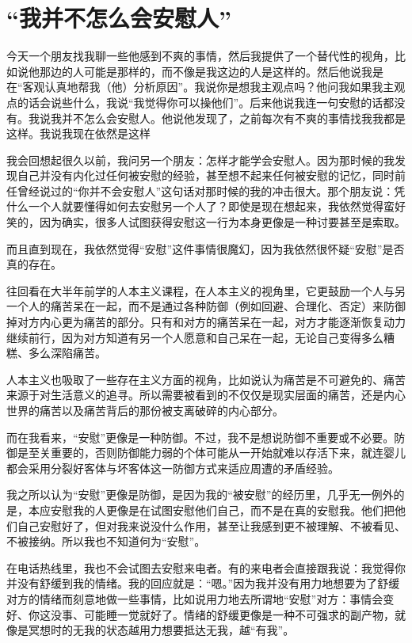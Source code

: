 \chapter{“我并不怎么会安慰人”}





今天一个朋友找我聊一些他感到不爽的事情，然后我提供了一个替代性的视角，比如说他那边的人可能是那样的，而不像是我这边的人是这样的。然后他说我是在“客观认真地帮我（他）分析原因”。我说你是想我主观点吗？他问我如果我主观点的话会说些什么，我说“我觉得你可以操他们”。后来他说我连一句安慰的话都没有。我说我并不怎么会安慰人。他说他发现了，之前每次有不爽的事情找我我都是这样。我说我现在依然是这样~

我会回想起很久以前，我问另一个朋友：怎样才能学会安慰人。因为那时候的我发现自己并没有内化过任何被安慰的经验，甚至想不起来任何被安慰的记忆，同时前任曾经说过的“你并不会安慰人”这句话对那时候的我的冲击很大。那个朋友说：凭什么一个人就要懂得如何去安慰另一个人了？即使是现在想起来，我依然觉得蛮好笑的，因为确实，很多人试图获得安慰这一行为本身更像是一种讨要甚至是索取。

而且直到现在，我依然觉得“安慰”这件事情很魔幻，因为我依然很怀疑“安慰”是否真的存在。

往回看在大半年前学的人本主义课程，在人本主义的视角里，它更鼓励一个人与另一个人的痛苦呆在一起，而不是通过各种防御（例如回避、合理化、否定）来防御掉对方内心更为痛苦的部分。只有和对方的痛苦呆在一起，对方才能逐渐恢复动力继续前行，因为对方知道有另一个人愿意和自己呆在一起，无论自己变得多么糟糕、多么深陷痛苦。

人本主义也吸取了一些存在主义方面的视角，比如说认为痛苦是不可避免的、痛苦来源于对生活意义的追寻。所以需要被看到的不仅仅是现实层面的痛苦，还是内心世界的痛苦以及痛苦背后的那份被支离破碎的内心部分。

而在我看来，“安慰”更像是一种防御。不过，我不是想说防御不重要或不必要。防御是至关重要的，否则防御能力弱的个体可能从一开始就难以存活下来，就连婴儿都会采用分裂好客体与坏客体这一防御方式来适应周遭的矛盾经验。

我之所以认为“安慰”更像是防御，是因为我的“被安慰”的经历里，几乎无一例外的是，本应安慰我的人更像是在试图安慰他们自己，而不是在真的安慰我。他们把他们自己安慰好了，但对我来说没什么作用，甚至让我感到更不被理解、不被看见、不被接纳。所以我也不知道何为“安慰”。

在电话热线里，我也不会试图去安慰来电者。有的来电者会直接跟我说：我觉得你并没有舒缓到我的情绪。我的回应就是：“嗯。”因为我并没有用力地想要为了舒缓对方的情绪而刻意地做一些事情，比如说用力地去所谓地“安慰”对方：事情会变好、你这没事、可能睡一觉就好了。情绪的舒缓更像是一种不可强求的副产物，就像是冥想时的无我的状态\pozhehao{}越用力想要抵达无我，越“有我”。

